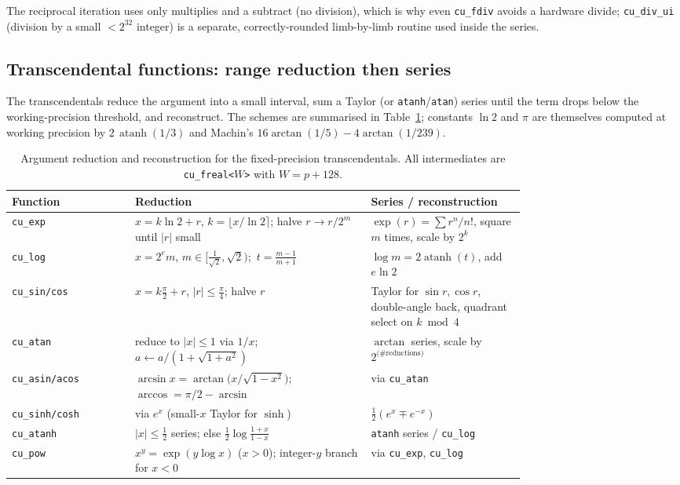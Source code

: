\documentclass[11pt,a4paper]{article}
\newcommand{\code}[1]{\texttt{#1}}
\newcommand{\PB}{\ensuremath{p}}
\begin{document}
The reciprocal iteration uses only multiplies and a subtract (no division), which
is why even \code{cu\_fdiv} avoids a hardware divide; \code{cu\_div\_ui} (division
by a small $<2^{32}$ integer) is a separate, correctly-rounded limb-by-limb
routine used inside the series.

\subsection{Transcendental functions: range reduction then series}
The transcendentals reduce the argument into a small interval, sum a Taylor (or
\code{atanh}/\code{atan}) series until the term drops below the working-precision
threshold, and reconstruct. The schemes are summarised in
Table~\ref{tab:trans}; constants $\ln 2$ and $\pi$ are themselves computed at
working precision by $2\,\operatorname{atanh}(1/3)$ and Machin's
$16\arctan(1/5)-4\arctan(1/239)$.

\begin{table}[h]
\centering
\renewcommand{\arraystretch}{1.2}
\begin{tabular}{@{}lp{0.46\linewidth}p{0.30\linewidth}@{}}
\toprule
Function & Reduction & Series / reconstruction\\
\midrule
\code{cu\_exp} & $x = k\ln 2 + r$, $k=\lfloor x/\ln2\rceil$; halve $r\!\to\!r/2^{m}$ until $|r|$ small & $\exp(r)=\sum r^n/n!$, square $m$ times, scale by $2^{k}$\\
\code{cu\_log} & $x=2^{e}m$, $m\in[\tfrac{1}{\sqrt2},\sqrt2)$;\ $t=\frac{m-1}{m+1}$ & $\log m = 2\operatorname{atanh}(t)$, add $e\ln2$\\
\code{cu\_sin/cos} & $x=k\frac{\pi}{2}+r$, $|r|\le\frac{\pi}{4}$; halve $r$ & Taylor for $\sin r,\cos r$, double-angle back, quadrant select on $k\bmod4$\\
\code{cu\_atan} & reduce to $|x|\le1$ via $1/x$; $a\leftarrow a/(1+\sqrt{1+a^2})$ & $\arctan$ series, scale by $2^{\text{(\#reductions)}}$\\
\code{cu\_asin/acos} & $\arcsin x=\arctan\!\big(x/\sqrt{1-x^2}\big)$; $\arccos = \pi/2-\arcsin$ & via \code{cu\_atan}\\
\code{cu\_sinh/cosh} & via $e^{x}$ (small-$x$ Taylor for $\sinh$) & $\tfrac12(e^x\mp e^{-x})$\\
\code{cu\_atanh} & $|x|\le\tfrac12$ series; else $\tfrac12\log\frac{1+x}{1-x}$ & \code{atanh} series / \code{cu\_log}\\
\code{cu\_pow} & $x^y=\exp(y\log x)$ ($x>0$); integer-$y$ branch for $x<0$ & via \code{cu\_exp}, \code{cu\_log}\\
\bottomrule
\end{tabular}
\caption{Argument reduction and reconstruction for the fixed-precision
transcendentals. All intermediates are \code{cu\_freal<$W$>} with $W=\PB+128$.}
\label{tab:trans}
\end{table}
\end{document}
